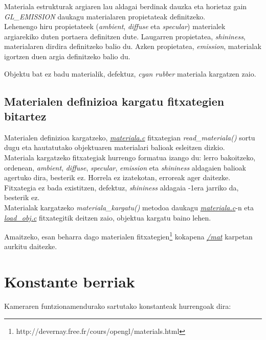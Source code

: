 \documentclass[12pt]{article}
\newcommand{\fitxategi}[1] {\underline{\textit{#1}}}
\newcommand{\metodo}[1] {\textit{#1}}
\newcommand{\aldagai}[1] {\textit{#1}}
\begin{document}
Materiala estrukturak argiaren lau aldagai berdinak dauzka eta horietaz gain \aldagai{GL\_EMISSION} daukagu materialaren propietateak definitzeko.\\

Lehenengo hiru propietateek (\aldagai{ambient}, \aldagai{diffuse} eta \aldagai{specular}) materialek argiarekiko duten portaera definitzen dute. Laugarren propietatea, \aldagai{shininess}, materialaren dirdira definitzeko balio du. Azken propietatea, \aldagai{emission}, materialak igortzen duen argia definitzeko balio du.

Objektu bat ez badu materialik, defektuz, \aldagai{cyan rubber} materiala kargatzen zaio.\\

\subsection{Materialen definizioa kargatu fitxategien bitartez}

Materialen definizioa kargatzeko, \fitxategi{materiala.c} fitxategian \metodo{read\_materiala()} sortu dugu eta hautatutako objektuaren materialari balioak esleitzen dizkio.\\

Materiala kargatzeko fitxategiak hurrengo formatua izango du: lerro bakoitzeko, ordenean, \aldagai{ambient}, \aldagai{diffuse}, \aldagai{specular}, \aldagai{emission} eta \aldagai{shininess} aldagaien balioak agertuko dira, besterik ez. Horrela ez izatekotan, erroreak ager daitezke. Fitxategia ez bada existitzen, defektuz, \aldagai{shininess} aldagaia -1era jarriko da, besterik ez.\\

Materialak kargatzeko \metodo{materiala\_kargatu()} metodoa daukagu \fitxategi{materiala.c}-n eta \fitxategi{load\_obj.c} fitxategitik deitzen zaio, objektua kargatu baino lehen.

Amaitzeko, esan beharra dago materialen fitxategien\footnote{http://devernay.free.fr/cours/opengl/materials.html} kokapena \fitxategi{/mat} karpetan aurkitu daitezke.

\section{Konstante berriak}\label{constants}

Kameraren funtzionamendurako sartutako konstanteak hurrengoak dira:
\end{document}
